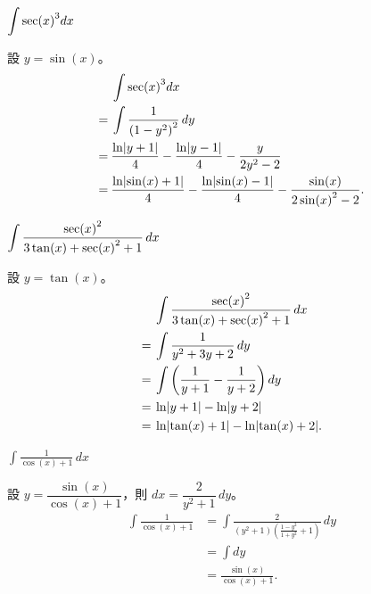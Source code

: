 \documentclass{beamer}
\newcommand{\Left} {\mathopen{}\mathclose\bgroup\left}
\newcommand{\Right}{\aftergroup\egroup\right}
\theoremstyle{remark}
\begin{document}
\begin{CJK}{UTF8}{bsmi}
\begin{frame}{$\displaystyle \int \sec \Left( x \Right)^3 dx$}
  \begin{solution}
    設 $y = \sin(x)$。
    \begin{align*}
	 & \int \sec \Left( x \Right)^3 dx\\
      =\:& \int \frac{1}{\left( 1 - y^2 \right)^2}\,dy\\
      =\:& \frac{\ln \Left| y + 1 \Right|}{4} - \frac{\ln \Left| y - 1 \Right|}{4} - \frac{y}{2y^2 - 2}\\
      =\:& \frac{\ln \Left| \sin(x) + 1 \Right|}{4} - \frac{\ln \Left| \sin(x) - 1 \Right|}{4} 
	  - \frac{\sin(x)}{2 \sin \Left( x \Right)^2 - 2}.
    \end{align*}
  \end{solution}
\end{frame}

\begin{frame}{$\displaystyle \int \frac{\sec \Left( x \Right)^2}{3\tan(x) + \sec \Left( x \Right)^2 + 1}\,dx$}
  \begin{solution}
    設 $y = \tan(x)$。
    \begin{align*}
	 & \int \frac{\sec \Left( x \Right)^2}{3\tan(x) + \sec \Left( x \Right)^2 + 1}\,dx\\
      =\:& \int \frac{1}{y^2 + 3y + 2}\,dy\\
      =\:& \int \left( \frac{1}{y+1} - \frac{1}{y+2} \right) dy\\
      =\:& \ln \Left| y+1 \Right| - \ln \Left| y+2 \Right|\\
      =\:& \ln \Left| \tan(x) + 1 \Right| - \ln \Left| \tan(x) + 2 \Right|.
    \end{align*}
  \end{solution}
\end{frame}

\begin{frame}{$\displaystyle \int \frac{1}{\cos(x) + 1}\,dx$}
  \begin{solution}
    設 $y = \dfrac{\sin(x)}{\cos(x) + 1}$，則 $dx = \dfrac{2}{y^2 + 1}\,dy$。
    \begin{align*}
      \int \frac{1}{\cos(x) + 1} &= \int \frac{2}{\left( y^2 + 1 \right) \left( \frac{1-y^2}{1+y^2} + 1 \right)}\,dy\\
	&= \int dy\\
	&= \frac{\sin(x)}{\cos(x) + 1}.
    \end{align*}
  \end{solution}
\end{frame}


\end{CJK}
\end{document}
